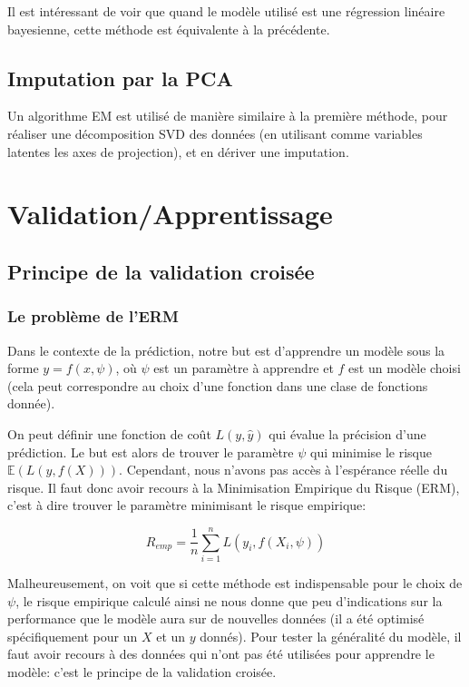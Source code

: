 \documentclass[12pt, a4paper]{article}
\begin{document}
Il est intéressant de voir que quand le modèle utilisé est une régression linéaire bayesienne, cette méthode est équivalente à la précédente.

\subsection{Imputation par la PCA}
Un algorithme EM est utilisé de manière similaire à la première méthode, pour réaliser une décomposition SVD des données (en utilisant comme variables latentes les axes de projection), et en dériver une imputation.

\section{Validation/Apprentissage}
\label{split}

\subsection{Principe de la validation croisée}
\subsubsection{Le problème de l'ERM}
Dans le contexte de la prédiction, notre but est d'apprendre un modèle sous la forme $y = f(x, \psi)$, où $\psi$ est un paramètre à apprendre et $f$ est un modèle choisi (cela peut correspondre au choix d'une fonction dans une clase de fonctions donnée).

On peut définir une fonction de coût $L(y,\hat{y})$ qui évalue la précision d'une prédiction. Le but est alors de trouver le paramètre $\psi$ qui minimise le risque $\mathbb{E}(L(y, f(X)))$. Cependant, nous n'avons pas accès à l'espérance réelle du risque. Il faut donc avoir recours à la Minimisation Empirique du Risque (ERM), c'est à dire trouver le paramètre minimisant le risque empirique:

$$ R_{emp} = \frac{1}{n} \sum\limits_{i=1}^n L(y_i, f(X_i, \psi))$$

Malheureusement, on voit que si cette méthode est indispensable pour le choix de $\psi$, le risque empirique calculé ainsi ne nous donne que peu d'indications sur la performance que le modèle aura sur de nouvelles données (il a été optimisé spécifiquement pour un $X$ et un $y$ donnés). Pour tester la généralité du modèle, il faut avoir recours à des données qui n'ont pas été utilisées pour apprendre le modèle: c'est le principe de la validation croisée.
\end{document}
